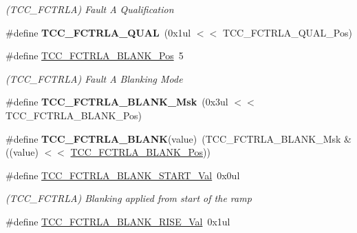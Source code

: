 \begin{DoxyCompactItemize}
\begin{DoxyCompactList}\small\item\em (T\+C\+C\+\_\+\+F\+C\+T\+R\+L\+A) Fault A Qualification \end{DoxyCompactList}\item 
\hypertarget{group___s_a_m_l21___t_c_c_ga32d62fc6900a749d0a24bbfebc998234}{}\#define {\bfseries T\+C\+C\+\_\+\+F\+C\+T\+R\+L\+A\+\_\+\+Q\+U\+A\+L}~(0x1ul $<$$<$ T\+C\+C\+\_\+\+F\+C\+T\+R\+L\+A\+\_\+\+Q\+U\+A\+L\+\_\+\+Pos)\label{group___s_a_m_l21___t_c_c_ga32d62fc6900a749d0a24bbfebc998234}

\item 
\hypertarget{group___s_a_m_l21___t_c_c_ga415d0c8ac0d97192b0e236e3a6184824}{}\#define \hyperlink{group___s_a_m_l21___t_c_c_ga415d0c8ac0d97192b0e236e3a6184824}{T\+C\+C\+\_\+\+F\+C\+T\+R\+L\+A\+\_\+\+B\+L\+A\+N\+K\+\_\+\+Pos}~5\label{group___s_a_m_l21___t_c_c_ga415d0c8ac0d97192b0e236e3a6184824}

\begin{DoxyCompactList}\small\item\em (T\+C\+C\+\_\+\+F\+C\+T\+R\+L\+A) Fault A Blanking Mode \end{DoxyCompactList}\item 
\hypertarget{group___s_a_m_l21___t_c_c_gaf0c0595260acef103a4935d2278f16a3}{}\#define {\bfseries T\+C\+C\+\_\+\+F\+C\+T\+R\+L\+A\+\_\+\+B\+L\+A\+N\+K\+\_\+\+Msk}~(0x3ul $<$$<$ T\+C\+C\+\_\+\+F\+C\+T\+R\+L\+A\+\_\+\+B\+L\+A\+N\+K\+\_\+\+Pos)\label{group___s_a_m_l21___t_c_c_gaf0c0595260acef103a4935d2278f16a3}

\item 
\hypertarget{group___s_a_m_l21___t_c_c_gabaaced2790012f26df2f5f222fb6f827}{}\#define {\bfseries T\+C\+C\+\_\+\+F\+C\+T\+R\+L\+A\+\_\+\+B\+L\+A\+N\+K}(value)~(T\+C\+C\+\_\+\+F\+C\+T\+R\+L\+A\+\_\+\+B\+L\+A\+N\+K\+\_\+\+Msk \& ((value) $<$$<$ \hyperlink{group___s_a_m_l21___t_c_c_ga415d0c8ac0d97192b0e236e3a6184824}{T\+C\+C\+\_\+\+F\+C\+T\+R\+L\+A\+\_\+\+B\+L\+A\+N\+K\+\_\+\+Pos}))\label{group___s_a_m_l21___t_c_c_gabaaced2790012f26df2f5f222fb6f827}

\item 
\hypertarget{group___s_a_m_l21___t_c_c_gac735e9a21fdc48838d75976a5f7a64d5}{}\#define \hyperlink{group___s_a_m_l21___t_c_c_gac735e9a21fdc48838d75976a5f7a64d5}{T\+C\+C\+\_\+\+F\+C\+T\+R\+L\+A\+\_\+\+B\+L\+A\+N\+K\+\_\+\+S\+T\+A\+R\+T\+\_\+\+Val}~0x0ul\label{group___s_a_m_l21___t_c_c_gac735e9a21fdc48838d75976a5f7a64d5}

\begin{DoxyCompactList}\small\item\em (T\+C\+C\+\_\+\+F\+C\+T\+R\+L\+A) Blanking applied from start of the ramp \end{DoxyCompactList}\item 
\hypertarget{group___s_a_m_l21___t_c_c_ga455a4d557f1350bd36aa311fdc23b4c2}{}\#define \hyperlink{group___s_a_m_l21___t_c_c_ga455a4d557f1350bd36aa311fdc23b4c2}{T\+C\+C\+\_\+\+F\+C\+T\+R\+L\+A\+\_\+\+B\+L\+A\+N\+K\+\_\+\+R\+I\+S\+E\+\_\+\+Val}~0x1ul\label{group___s_a_m_l21___t_c_c_ga455a4d557f1350bd36aa311fdc23b4c2}


\end{DoxyCompactItemize}
